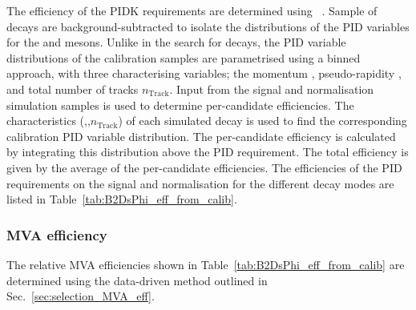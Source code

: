 The efficiency of the PIDK requirements are determined using \pidcalib~\cite{PIDCalib}. 
Sample of \decay{\Dstarp}{(\decay{\Dz}{\Kp\pim})\pip} decays are background-subtracted to isolate the distributions of the PID variables for the \Kp and \pim mesons. 
Unlike in the search for \decay{\Bp}{\Dsp\Kp\Km} decays, the PID variable distributions of the calibration samples are parametrised using a binned approach, with three characterising variables; the momentum \ptot, pseudo-rapidity \Peta, and total number of tracks $n_{\text{Track}}$. Input from the signal and normalisation simulation samples is used to determine per-candidate efficiencies. The characteristics (\ptot,\Peta,$n_{\text{Track}}$) of each simulated decay is used to find the corresponding calibration PID variable distribution. The per-candidate efficiency is calculated by integrating this distribution above the PID requirement. The total efficiency is given by the average of the per-candidate efficiencies. The efficiencies of the PID requirements on the signal and normalisation for the different \Dsp decay modes are listed in Table~\ref{tab:B2DsPhi_eff_from_calib}.


\subsubsection{MVA efficiency}
\label{sec:B2DsPhi_eff_MVA}

The relative MVA efficiencies shown in Table~\ref{tab:B2DsPhi_eff_from_calib} are determined using the data-driven method outlined in Sec.~\ref{sec:selection_MVA_eff}. 




